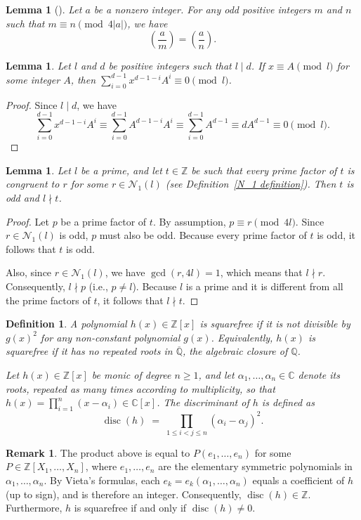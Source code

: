 \documentclass[11pt,a4paper]{amsart}
\newcommand{\CC}{\mathbb{C}}
\newcommand{\ZZ}{\mathbb{Z}}
\newcommand{\Q}{\mathbb{Q}}
\newcommand{\Qbar}{\overline{\mathbb{Q}}}
\theoremstyle{plain}
\newtheorem{lemma}[theorem]{Lemma}
\newtheorem{defn}[theorem]{Definition}
\theoremstyle{definition}
\newtheorem{remark}[theorem]{Remark}
\DeclareMathOperator{\disc}{disc}
\begin{document}
\begin{lemma}[{\cite[Theorem~1.4.9]{Cohen}}]\label{lemma:jacobi_periodicity}
Let $a$ be a nonzero integer. For any odd positive integers $m$ and $n$ such that $m \equiv n \pmod{4|a|}$, we have
\[
    \left(\frac{a}{m}\right) = \left(\frac{a}{n}\right).
\]
\end{lemma}
\begin{lemma}\label{lem:sum_div}
Let $l$ and $d$ be positive integers such that $l \mid d$. If $x \equiv A \pmod l$ for some integer $A$, then $\sum_{i=0}^{d-1} x^{d-1-i}A^i \equiv 0 \pmod l$.
\end{lemma}
\begin{proof}Since $l\mid d$, we have
\begin{equation}
    \sum_{i=0}^{d-1} x^{d-1-i}A^i \equiv\sum_{i=0}^{d-1} A^{d-1-i}A^i \equiv \sum_{i=0}^{d-1} A^{d-1} \equiv d A^{d-1}\equiv0 \pmod l.
\end{equation}
\end{proof}
\begin{lemma}\label{lem:t_odd}
    Let $l$ be a prime, and let $t \in \ZZ$ be such that every prime factor of $t$ is congruent to $r$ for some $r \in \mathcal{N}_1(l)$ (see Definition~\ref{N_1 definition}). Then $t$ is odd and $l \nmid t$. 
\end{lemma}
\begin{proof}
Let $p$ be a prime factor of $t$. By assumption, $p \equiv r \pmod{4l}$. Since $r \in \mathcal{N}_1(l)$ is odd, $p$ must also be odd. Because every prime factor of $t$ is odd, it follows that $t$ is odd.

Also, since $r \in \mathcal{N}_1(l)$, we have $\gcd(r, 4l) = 1$, which means that $l\nmid r$. Consequently, $l \nmid p$ (i.e., $p \neq l$). Because $l$ is a prime and it is different from all the prime factors of $t$, it follows that $l \nmid t$.
\end{proof}
\begin{defn}\label{def:discriminant}
A polynomial $h(x) \in \ZZ[x]$ is \textit{squarefree} if it is not
divisible by $g(x)^2$ for any non-constant polynomial $g(x)$. Equivalently, $h(x)$ is squarefree if it has no repeated roots in $\Qbar$, the algebraic closure of $\Q$.

Let $h(x) \in \ZZ[x]$ be monic of degree $n \ge 1$, and let
$\alpha_1, \dots, \alpha_n \in \CC$ denote its roots, repeated as many times according to multiplicity, so that $  h(x) = \prod_{i=1}^{n} (x - \alpha_i) \in \CC[x]$. The \textit{discriminant} of $h$ is defined as
\[
  \disc(h) \;=\; \prod_{1 \le i < j \le n} (\alpha_i - \alpha_j)^2 .
\]
\end{defn}
\begin{remark}\label{discriminant nonzero}
The product above is equal to $P(e_1,\ldots,e_n)$ for some $P\in \ZZ[X_{1},\dots,X_n]$,  where $e_1, \dots, e_n$  are the elementary symmetric polynomials in $\alpha_1, \dots, \alpha_n$. By Vieta's formulas, each
$e_k = e_k(\alpha_1, \dots, \alpha_n)$ equals a
coefficient of $h$ (up to sign), and is therefore an integer. Consequently, $\disc(h) \in \ZZ$. Furthermore, $h$ is squarefree if and only if $\disc(h) \ne 0$.

\end{remark}
\end{document}
